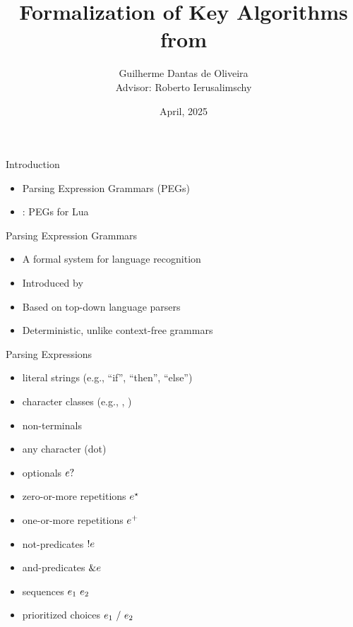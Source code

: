 \documentclass{beamer}
\title[Master's Thesis Defense]%
{Formalization of Key Algorithms from \lpeg{}}
\author[Guilherme Dantas]
{Guilherme Dantas de Oliveira \texorpdfstring{\\ \vspace{10pt}}{and}
\footnotesize Advisor: Roberto Ierusalimschy}
\institute[PUC-Rio]%
{Pontifical Catholic University of Rio de Janeiro}
\date{April, 2025}
\begin{document}
\begin{frame}
    \titlepage
\end{frame}

\begin{frame}{Introduction}
    \begin{itemize}
        \item Parsing Expression Grammars (PEGs)
        \item \lpeg{}: PEGs for Lua
    \end{itemize}
\end{frame}

\begin{frame}{Parsing Expression Grammars}
    \begin{itemize}
        \item A formal system for language recognition
        \item Introduced by \cite{ford_parsing_2004}
        \item Based on top-down language parsers
        \item Deterministic, unlike context-free grammars
    \end{itemize}
\end{frame}

\begin{frame}{Parsing Expressions}
    \begin{itemize}
        \item literal strings (e.g., ``if'', ``then'', ``else'')
        \item character classes (e.g., , )
        \item non-terminals
        \item any character (dot)
        \item optionals $e?$
        \item zero-or-more repetitions $e^\star$
        \item one-or-more repetitions $e^+$
        \item not-predicates $!e$
        \item and-predicates $\&e$
        \item sequences $e_1\ e_2$
        \item prioritized choices $e_1\ /\ e_2$
    \end{itemize}
\end{frame}

\newcommand{\FordMatch}[4]{#1 \vdash (#2, #3) \rightsquigarrow #4}
\end{document}
